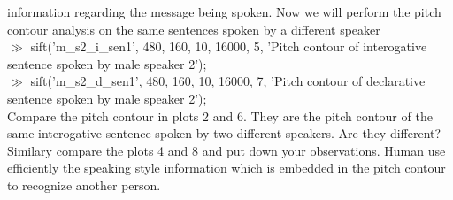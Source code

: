 information regarding the message being spoken. Now we will perform
the pitch contour analysis on the same sentences spoken by a different
speaker\\[1ex]
$\gg$ sift('m\_s2\_i\_sen1', 480, 160, 10, 16000, 5, 'Pitch contour
of interogative sentence spoken by male speaker 2');\\[1ex]
$\gg$ sift('m\_s2\_d\_sen1', 480, 160, 10, 16000, 7, 'Pitch contour
of declarative sentence spoken by male speaker 2');\\[1ex]
Compare the pitch contour in plots 2 and 6. They are
the pitch contour of the same interogative sentence spoken by two
different speakers. Are they different? Similary compare the plots 4
and 8 and put down your observations. Human use efficiently the
speaking style information which is embedded in the pitch contour to
recognize another person.\\[2ex]




